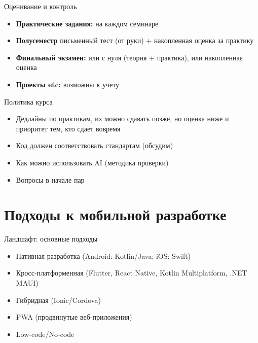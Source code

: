 \documentclass[aspectratio=169]{beamer}
\begin{document}
\begin{frame}{Оценивание и контроль}
  \begin{itemize}
    \item \textbf{Практические задания:} на каждом семинаре
    \item \textbf{Полусеместр} письменный тест (от руки) + накопленная оценка за практику
    \item \textbf{Финальный экзамен:} или с нуля (теория + практика), или накопленная оценка
    \item \textbf{Проекты etc:} возможны к учету
  \end{itemize}
\end{frame}

\begin{frame}{Политика курса}
  \begin{itemize}
    \item Дедлайны по практикам, их можно сдавать позже, но оценка ниже и приоритет тем, кто сдает вовремя
    \item Код должен соответствовать стандартам (обсудим)
    \item Как можно использовать AI (методика проверки)
    \item Вопросы в начале пар
  \end{itemize}
\end{frame}


\section{Подходы к мобильной разработке}

\begin{frame}{Ландшафт: основные подходы}
  \begin{itemize}
    \item Нативная разработка (Android: Kotlin/Java; iOS: Swift)
    \item Кросс-платформенная (Flutter, React Native, Kotlin Multiplatform, .NET MAUI)
    \item Гибридная (Ionic/Cordova)
    \item PWA (продвинутые веб-приложения)
    \item Low-code/No-code
  \end{itemize}
\end{frame}
\end{document}
